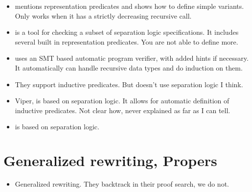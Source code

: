 \documentclass[thesis.tex]{subfiles}
\begin{document}
\begin{itemize}
    \item \cite{caoVSTFloydSeparationLogic2018} mentions representation predicates and shows how to define simple variants. Only works when it has a strictly decreasing recursive call.
    \item \cite{berdineSmallfootModularAutomatic2005} is a tool for checking a subset of separation logic specifications. It includes several built in representation predicates. You are not able to define more.
    \item \cite{leinoDafnyAutomaticProgram2010} uses an SMT based automatic program verifier, with added hints if necessary. It automatically can handle recursive data types and do induction on them.
    \item \cite{filliatreOneLogicUse2013} They support inductive predicates. But doesn't use separation logic I think.
    \item \cite{mullerViperVerificationInfrastructure2016,summersAutomatingDeductiveVerification2018} Viper, is based on separation logic. It allows for automatic definition of inductive predicates. Not clear how, never explained as far as I can tell.
    \item \cite{jacobsVeriFastPowerfulSound2011} is based on separation logic.
\end{itemize}

\section{Generalized rewriting, Propers}
\begin{itemize}
    \item \cite{sozeauNewLookGeneralized2009} Generalized rewriting. They backtrack in their proof search, we do not.
\end{itemize}
\end{document}
